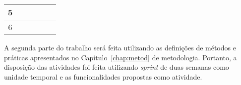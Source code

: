 \begin{table}[H]
\begin{tabular}{|c|l|l|l|l|l|}
    5                                         &                                                                                    &                                                                                    & \cellcolor[HTML]{9B9B9B}                                                          & \cellcolor[HTML]{9B9B9B}                                                           &                                                                                    \\ \hline
    6                                         &                                                                                    &                                                                                    &                                                                                   & \cellcolor[HTML]{9B9B9B}                                                           & \cellcolor[HTML]{9B9B9B}                                                           \\ \hline
  \end{tabular}
\end{table}

A segunda parte do trabalho será feita utilizando as definições de
métodos e práticas apresentados no Capítulo~\ref{chap:metod} de metodologia.
Portanto, a disposição das atividades foi feita utilizando \textit{sprint} de
duas semanas como unidade temporal e as funcionalidades propostas como
atividade.

